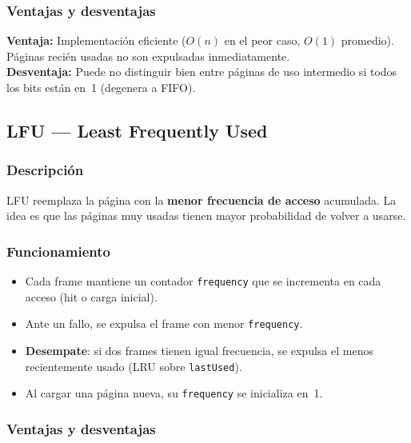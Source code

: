 \documentclass[12pt, a4paper]{article}
\begin{document}
\subsubsection{Ventajas y desventajas}

\begin{infobox}[title={Clock}]
\textbf{Ventaja:} Implementación eficiente ($O(n)$ en el peor caso, $O(1)$ promedio). Páginas recién usadas no son expulsadas inmediatamente. \\
\textbf{Desventaja:} Puede no distinguir bien entre páginas de uso intermedio si todos los bits están en~1 (degenera a FIFO).
\end{infobox}

\subsection{LFU — Least Frequently Used}

\subsubsection{Descripción}

LFU reemplaza la página con la \textbf{menor frecuencia de acceso} acumulada. La idea es que las páginas muy usadas tienen mayor probabilidad de volver a usarse.

\subsubsection{Funcionamiento}

\begin{itemize}
  \item Cada frame mantiene un contador \texttt{frequency} que se incrementa en cada acceso (hit o carga inicial).
  \item Ante un fallo, se expulsa el frame con menor \texttt{frequency}.
  \item \textbf{Desempate}: si dos frames tienen igual frecuencia, se expulsa el menos recientemente usado (LRU sobre \texttt{lastUsed}).
  \item Al cargar una página nueva, su \texttt{frequency} se inicializa en~1.
\end{itemize}

\subsubsection{Ventajas y desventajas}
\end{document}

